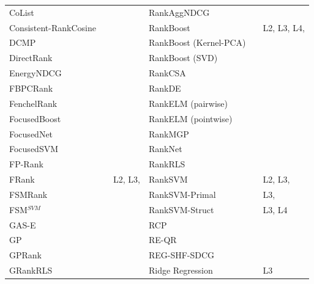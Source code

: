 \documentclass[english, authoryear, preprint]{elsarticle}
\begin{document}
\begin{table}[!hpt]
{\begin{tabular}{lll|lll}
CoList & \cite{Gao2014} & \cite{Gao2014} & RankAggNDCG & \cite{Wang2013} & \cite{Wang2013} \\
Consistent-RankCosine & \cite{Ravikumar2011} & \cite{Tan2013} & RankBoost & \cite{Freund2003} & L2, L3, L4, \cite{Busa-Fekete2013, Alcantara2010, Sato2013} \\
DCMP & \cite{Renjifo2012}  & \cite{Renjifo2012}  & RankBoost (Kernel-PCA) & \cite{Duh2008} & \cite{Duh2008, Sato2013} \\
DirectRank & \cite{Tan2013} & \cite{Tan2013} & RankBoost (SVD) & \cite{Lin2009} & \cite{Lin2009} \\
EnergyNDCG & \cite{Freno2011} & \cite{Freno2011} & RankCSA & \cite{He2010} & \cite{He2010} \\
FBPCRank & \cite{Lai2011} & \cite{Lai2011} & RankDE & \cite{Bollegala2011} & \cite{Sato2013} \\
FenchelRank & \cite{Lai2013} & \cite{Lai2013, Lai2013b, Laporte2013} & RankELM (pairwise) & \cite{Zong2013} & \cite{Zong2013} \\ 
FocusedBoost & \cite{Niu2012} & \cite{Niu2012} &  RankELM (pointwise) & \cite{Zong2013} & \cite{Zong2013} \\ 
FocusedNet & \cite{Niu2012} & \cite{Niu2012} & RankMGP & \cite{Lin2012} & \cite{Lin2012} \\ 
FocusedSVM & \cite{Niu2012} & \cite{Niu2012} & RankNet & \cite{Burges2005} & \cite{Busa-Fekete2013, Papini2012, Niu2012} \\ 
FP-Rank & \cite{Song2013} & \cite{Song2013} & RankRLS & \cite{Pahikkala2009} & \cite{Pahikkala2010} \\ 
FRank & \cite{Tsai2007} & L2, L3, \cite{Wang2012} & RankSVM & \cite{Herbrich1999, Joachims2002} & L2, L3, \cite{Busa-Fekete2013, Freno2011, He2010, Alcantara2010, Papini2012} \\ 
FSMRank & \cite{Lai2013c} & \cite{Lai2013c,Laporte2013} & RankSVM-Primal &  & L3, \cite{Lai2011} \\ 
FSM$^{SVM}$ & \cite{Lai2013c} & \cite{Lai2013c} & RankSVM-Struct &  & L3, L4 \\
GAS-E & \cite{Geng2007} & \cite{Lai2013c} & RCP & \cite{Elsas2008} & \cite{Elsas2008} \\ 
GP & \cite{DeAlmeida2007} & \cite{Alcantara2010} & RE-QR & \cite{Veloso2010} & \cite{Veloso2010} \\
GPRank & \cite{Silva2009} & \cite{Torkestani2012} & REG-SHF-SDCG & \cite{Wu2009} & \cite{Wu2009} \\  
GRankRLS & \cite{Pahikkala2010} & \cite{Pahikkala2010} & Ridge Regression & \cite{Cossock2006} & L3 \\

\end{tabular}}
\end{table}
\end{document}
